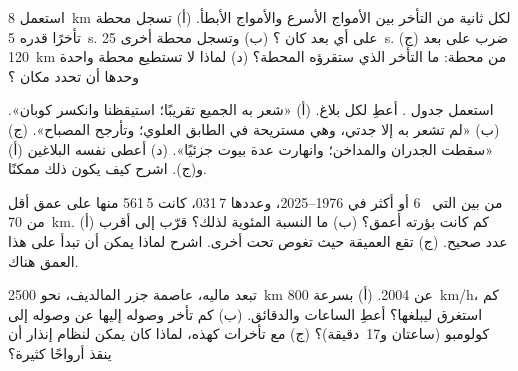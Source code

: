 \begin{exercise}[$\star\star$]\label{exo:g7:earthquakes:7}
استعمل \qty{8}{km} لكل ثانية من التأخر بين الأمواج الأسرع والأمواج
الأبطأ. (أ) تسجل محطة تأخرًا قدره \qty{5}{s}. على أي بعد كان ؟ (ب)
وتسجل محطة أخرى \qty{25}{s}. (ج) ضرب  على بعد \qty{120}{km} من
محطة: ما التأخر الذي ستقرؤه المحطة؟ (د) لماذا لا تستطيع محطة واحدة وحدها
أن تحدد مكان ؟
\end{exercise}

\begin{exercise}[$\star\star$]\label{exo:g7:earthquakes:8}
استعمل جدول . أعطِ  لكل بلاغ. (أ) «شعر به الجميع تقريبًا؛
استيقظنا وانكسر كوبان». (ب) «لم تشعر به إلا جدتي، وهي مستريحة في الطابق
العلوي؛ وتأرجح المصباح». (ج) «سقطت الجدران والمداخن؛ وانهارت عدة بيوت
جزئيًا». (د) أعطى  نفسه البلاغين (أ) و(ج). اشرح كيف يكون ذلك
ممكنًا.
\end{exercise}

\begin{exercise}[$\star\star$]\label{exo:g7:earthquakes:9}
من بين  التي ~6 أو أكثر في 1976--2025، وعددها 7\,031، كانت
 5\,561 منها على عمق أقل من \qty{70}{km}. (أ) كم  كانت بؤرته
أعمق؟ (ب) ما النسبة المئوية لذلك؟ قرّب إلى أقرب عدد صحيح. (ج) تقع 
العميقة حيث تغوص  تحت أخرى. اشرح لماذا يمكن أن تبدأ على هذا العمق
هناك.
\end{exercise}

\begin{exercise}[$\star\star$]\label{exo:g7:earthquakes:10}
تبعد ماليه، عاصمة جزر المالديف، نحو \qty{2500}{km} عن  
2004. (أ) بسرعة \qty{800}{km/h}، كم استغرق  ليبلغها؟ أعطِ
الساعات والدقائق. (ب) كم تأخر وصوله إليها عن وصوله إلى كولومبو (ساعتان
و17~دقيقة)؟ (ج) مع تأخرات كهذه، لماذا كان يمكن لنظام إنذار أن ينقذ أرواحًا
كثيرة؟
\end{exercise}

